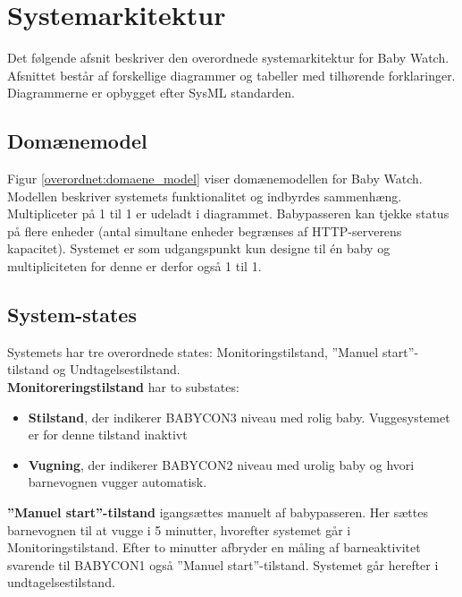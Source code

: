\section{Systemarkitektur}

Det følgende afsnit beskriver den overordnede systemarkitektur for Baby Watch. Afsnittet består af forskellige diagrammer og tabeller med tilhørende forklaringer. Diagrammerne er opbygget efter SysML standarden.

\subsection{Domænemodel}

Figur \ref{overordnet:domaene_model} viser domænemodellen for Baby Watch. Modellen beskriver systemets funktionalitet og indbyrdes sammenhæng. Multipliceter på 1 til 1 er udeladt i diagrammet. Babypasseren kan tjekke status på flere enheder (antal simultane enheder begrænses af HTTP-serverens kapacitet). Systemet er som udgangspunkt kun designe til én baby og multipliciteten for denne er derfor også 1 til 1.

\subsection{System-states}

Systemets har tre overordnede states: Monitoringstilstand, ''Manuel start''-tilstand og Undtagelsestilstand. \\\textbf{Monitoreringstilstand} har to substates: 
\begin{itemize}
	\item \textbf{Stilstand}, der indikerer BABYCON3 niveau med rolig baby. Vuggesystemet er for denne tilstand inaktivt
	\item \textbf{Vugning}, der indikerer BABYCON2 niveau med urolig baby og hvori barnevognen vugger automatisk.
\end{itemize}

\textbf{''Manuel start''-tilstand} igangsættes manuelt af babypasseren. Her sættes barnevognen til at vugge i 5 minutter, hvorefter systemet går i Monitoringstilstand. Efter to minutter afbryder en måling af barneaktivitet svarende til BABYCON1 også ''Manuel start''-tilstand. Systemet går herefter i undtagelsestilstand.

